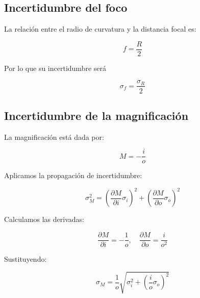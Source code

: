 \documentclass[article,12pt]{elsarticle}
\begin{document}
\subsection*{Incertidumbre del foco}
La relación entre el radio de curvatura y la distancia focal es:

\begin{mdframed}
\begin{equation}
    f=\frac{R}{2}
\end{equation}
\end{mdframed}

Por lo que su incertidumbre será

\begin{mdframed}
\begin{equation}
    \sigma _f=\frac{\sigma _R}{2}
\end{equation}
\end{mdframed}

\subsection*{Incertidumbre de la magnificación}
La magnificación está dada por:
\begin{mdframed}
\begin{equation}
    M = -\frac{i}{o}
\end{equation}
\end{mdframed}

Aplicamos la propagación de incertidumbre:
\begin{mdframed}
\begin{equation}
    \sigma_M^2 = \left( \frac{\partial M}{\partial i} \sigma_i \right)^2 + \left( \frac{\partial M}{\partial o} \sigma_o \right)^2
\end{equation}
\end{mdframed}
Calculamos las derivadas:
\begin{mdframed}
\begin{equation}
    \frac{\partial M}{\partial i} = -\frac{1}{o}, \quad \frac{\partial M}{\partial o} = \frac{i}{o^2}
\end{equation}
\end{mdframed}
Sustituyendo:
\begin{mdframed}
\begin{equation}
    \sigma_M = \frac{1}{o} \sqrt{\sigma_i^2 + \left(\frac{i}{o} \sigma_o\right)^2}
\end{equation}
\end{mdframed}
\end{document}
